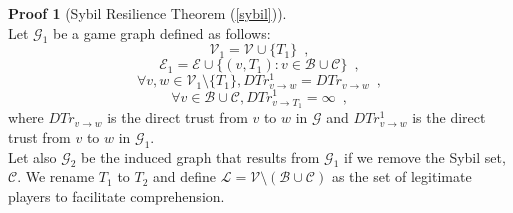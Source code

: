 \documentclass[11pt]{llncs}
\theoremstyle{definition}
\newtheorem*{sepproof}{Proof}
\begin{document}
    \begin{sepproof}[Sybil Resilience Theorem (\ref{sybil})] \ \\
    \label{sybilproof}
       Let $\mathcal{G}_1$ be a game graph defined as follows:
       \begin{equation*}
          \mathcal{V}_1 = \mathcal{V} \cup \{T_1\} \enspace,
       \end{equation*}
       \begin{equation*}
          \mathcal{E}_1 = \mathcal{E} \cup \{(v, T_1) : v \in \mathcal{B} \cup \mathcal{C}\} \enspace,
       \end{equation*}
       \begin{equation*}
          \forall v,w \in \mathcal{V}_1 \setminus \{T_1\}, DTr^1_{v \rightarrow w} = DTr_{v \rightarrow w} \enspace,
       \end{equation*}
       \begin{equation*}
          \forall v \in \mathcal{B} \cup \mathcal{C}, DTr^1_{v \rightarrow T_1} = \infty \enspace,
       \end{equation*}
       where $DTr_{v \rightarrow w}$ is the direct trust from $v$ to $w$ in $\mathcal{G}$ and $DTr^1_{v \rightarrow w}$ is
       the direct trust from $v$ to $w$ in $\mathcal{G}_1$. \\
       Let also $\mathcal{G}_2$ be the induced graph that results from $\mathcal{G}_1$ if we remove the Sybil set,
       $\mathcal{C}$. We rename $T_1$ to $T_2$ and define $\mathcal{L} = \mathcal{V} \setminus \left(\mathcal{B} \cup
       \mathcal{C}\right)$ as the set of legitimate players to facilitate comprehension.
       \begin{center}
\end{center}
\end{sepproof}
\end{document}
